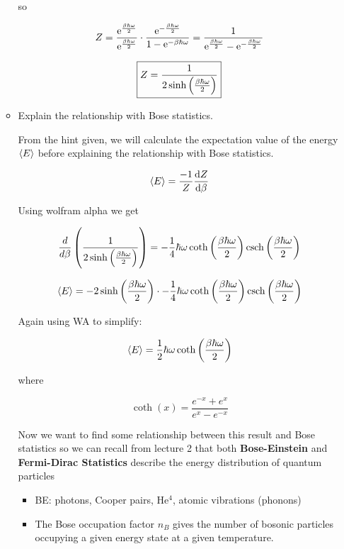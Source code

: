\begin{enumerate}[label=(\alph*)]
\begin{itemize}
        so

        \[ Z = \frac{\e^{ \frac{\beta \hbar \omega}{2}}}{\e^{\frac{\beta \hbar \omega}{2}}} \cdot  \frac{\e^{- \frac{\beta \hbar \omega}{2}}}{1- \e^{-\beta \hbar \omega}} = \frac{1}{\e^{ \frac{\beta \hbar \omega}{2}} - \e^{- \frac{\beta \hbar \omega}{2}}}\]


        \[ \boxed{ Z = \frac{1}{2 \sinh{\paren*{\frac{\beta \hbar \omega}{2}}}} }\]

        \item Explain the relationship with Bose statistics.
        
        \divider

        From the hint given, we will calculate the expectation value of the energy $\avg{E}$ before explaining the relationship with Bose statistics.

        \[ \avg{E} = \frac{-1}{Z} \dv{Z}{\beta} \]

        Using wolfram alpha we get 

        \[
        \frac{d}{d\beta} \left( \frac{1}{2 \sinh\left( \frac{\beta \hbar \omega}{2} \right)} \right)
        = -\frac{1}{4} \hbar \omega \coth\left( \frac{\beta \hbar \omega}{2} \right) \csch\left( \frac{\beta \hbar \omega}{2} \right)
        \]

        \[ \avg{E} = - 2 \sinh{\paren*{\frac{\beta \hbar \omega}{2}}} \cdot -\frac{1}{4} \hbar \omega \coth\left( \frac{\beta \hbar \omega}{2} \right) \csch\left( \frac{\beta \hbar \omega}{2} \right)\]

        Again using WA to simplify:

        \[
        \avg{E} = \frac{1}{2} \hbar \omega \coth\left( \frac{\beta \hbar \omega}{2} \right)
        \]

        where 

        \[
        \coth{(x)} = \frac{e^{-x} + e^{x}}{e^{x} - e^{-x}}
        \]

        Now we want to find some relationship between this result and Bose statistics so we can recall from lecture 2 that both \textbf{Bose-Einstein} and \textbf{Fermi-Dirac Statistics} describe the energy distribution of quantum particles

        \begin{itemize}
            \item BE: photons, Cooper pairs, He$^4$, atomic vibrations (phonons)

            \item The Bose occupation factor $n_B$ gives the number of bosonic particles occupying a given energy state at a given temperature.


\end{itemize}
\end{itemize}
\end{enumerate}
